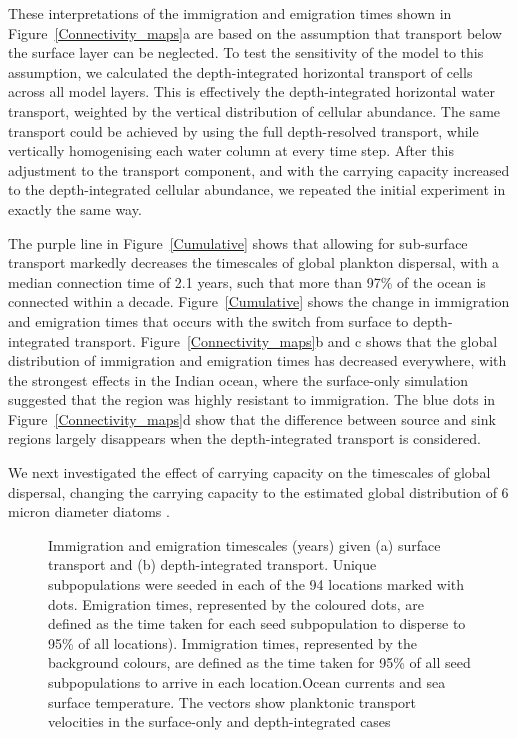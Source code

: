 \documentclass[12pt]{article}
\begin{document}
These interpretations of the immigration and emigration times shown in Figure~\ref{Connectivity_maps}a are based on the assumption that transport below the surface layer can be neglected. To test the sensitivity of the model to this assumption, we calculated the depth-integrated horizontal transport of cells across all model layers. This is effectively the depth-integrated horizontal water transport, weighted by the vertical distribution of cellular abundance. The same transport could be achieved by using the full depth-resolved transport, while vertically homogenising each water column at every time step. After this adjustment to the transport component, and with the carrying capacity increased to the depth-integrated cellular abundance, we repeated the initial experiment in exactly the same way. 


The purple line in Figure~\ref{Cumulative} shows that allowing for sub-surface transport markedly decreases the timescales of global plankton dispersal, with a median connection time of 2.1 years, such that more than 97\% of the ocean is connected within a decade. Figure~\ref{Cumulative} shows the change in immigration and emigration times that occurs with the switch from surface to depth-integrated transport. Figure~\ref{Connectivity_maps}b and c shows that the global distribution of immigration and emigration times has decreased everywhere, with the strongest effects in the Indian ocean, where the surface-only simulation suggested that the region was highly resistant to immigration. The blue dots in Figure~\ref{Connectivity_maps}d show that the difference between source and sink regions largely disappears when the depth-integrated transport is considered. 

We next investigated the effect of carrying capacity on the timescales of global dispersal, changing the carrying capacity to the estimated global distribution of 6 micron diameter diatoms \citep{ref}.

\begin{figure}[t!]
    \centering
    \caption{Immigration and emigration timescales (years) given (a) surface transport and (b) depth-integrated transport. Unique subpopulations were seeded in each of the 94 locations marked with dots. Emigration times, represented by the coloured dots, are defined as the time taken for each seed subpopulation to disperse to 95\% of all locations). Immigration times, represented by the background colours, are defined as the time taken for 95\% of all seed subpopulations to arrive in each location.Ocean currents and sea surface temperature. The vectors show planktonic transport velocities in the surface-only and depth-integrated cases}
\label{Imm_vs_em}
\end{figure}
\end{document}
